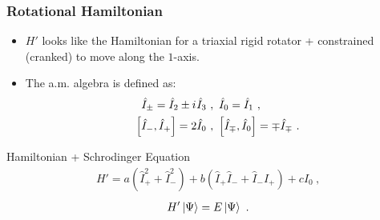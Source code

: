 \documentclass{beamer}
\newcommand{\iu}{{i\mkern1mu}}
\begin{document}
\begin{frame}
  \frametitle{Rotational Hamiltonian}
  \begin{itemize}
    \item $H'$ looks like the Hamiltonian for a triaxial rigid rotator + constrained (cranked) to move along the $1$-axis.
    \item The a.m. algebra is defined as:
    \begin{align}
      \hat{I}_\pm=\hat{I}_2\pm \iu\hat{I}_3\ &,\ \hat{I}_0=\hat{I}_1\ ,\\
      \left[\hat{I}_-,\hat{I}_+\right]=2\hat{I}_0\ &,\ \left[\hat{I}_\mp,\hat{I}_0\right]=\mp\hat{I}_\mp\ .
    \end{align}
  \end{itemize}
\begin{block}{Hamiltonian + Schrodinger Equation}
  \begin{align}
    H'=a\left(\hat{I}_+^2+\hat{I}_-^2\right)+b\left(\hat{I}_+\hat{I}_-+\hat{I}_-\hat{I}_+\right)+c\hat{I}_0\ ,
  \end{align}
  \begin{align}    
    H'\ket{\Psi}=E\ket{\Psi}\ .
  \end{align}
\end{block}
\end{frame}

\end{document}
